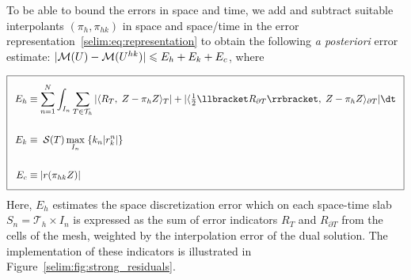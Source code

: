 To be able to bound the errors in space and time, we
add and subtract suitable interpolants $(\pi_h, \pi_{hk})$ in space
and space/time in the error
representation~\eqref{selim:eq:representation} to obtain the following
\emph{a posteriori} error estimate: $|\mathcal{M}(U) - \mathcal{M}(U^{hk})| \leqslant  E_h +
E_k + E_c$, where

\begin{equation}
\label{selim:eq:aposteriori}
\addtolength{\fboxsep}{5pt} \boxed{
\begin{split}
E_h &\equiv \sum_{n=1}^{N}\int_{I_n} \sum_{T\in\mathcal{T}_h}| \langle
R_T,\; Z - \pi_h Z \rangle_T |+ | \langle \tfrac{1}{2}\llbracket R_{\partial T}
\rrbracket,\; Z - \pi_h Z \rangle _{\partial T}|\dt\\\\ E_k &\equiv
\;\mathcal{S}(T)\max_{I_n}\;\{k_n | r_k ^n|\}\\\\ E_c &\equiv
|r(\pi_{hk}Z)|
\end{split}
}
\end{equation}
Here, $E_h$ estimates the space discretization error which on each
space-time slab $S_n = \mathcal{T}_h \times I_n$ is expressed as the sum
of error indicators $R_T$ and $R_{\partial T}$ from the cells of the
mesh, weighted by the interpolation error of the dual solution. The
implementation of these indicators is illustrated in Figure~\ref{selim:fig:strong_residuals}.

